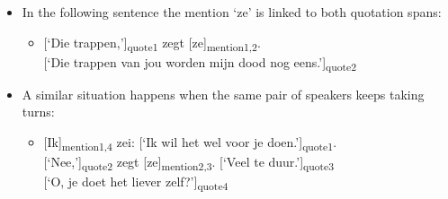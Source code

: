 \begin{itemize}
\item In the following sentence the mention `ze' is linked to both quotation spans:
    \begin{itemize}
                \item {[}`Die trappen,'{]}\textsubscript{quote1} zegt [ze]\textsubscript{mention1,2}. \\ {[}`Die trappen van jou worden mijn dood nog eens.']\textsubscript{quote2}
    \end{itemize}
    
\item A similar situation happens when the same pair of speakers keeps taking turns:
    \begin{itemize}
                \item {[}Ik{]}\textsubscript{mention1,4} zei: {[}`Ik wil het wel voor je doen.'{]}\textsubscript{quote1}. \\
                {[}`Nee,']\textsubscript{quote2} zegt {[}ze{]}\textsubscript{mention2,3}. {[}`Veel te duur.'{]}\textsubscript{quote3}\\
                {[}`O, je doet het liever zelf?'{]}\textsubscript{quote4}
    \end{itemize}

\end{itemize}




